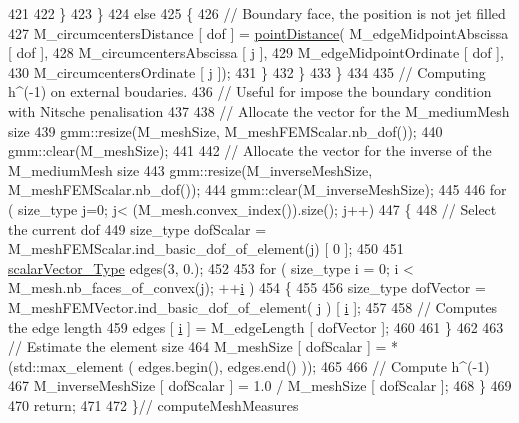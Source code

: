 \begin{DoxyCode}
421 
422                 \}
423             \}
424             \textcolor{keywordflow}{else}
425             \{
426                 \textcolor{comment}{// Boundary face, the position is not jet filled}
427                 M\_circumcentersDistance [ dof ] = \hyperlink{UsefulFunctions_8h_ad9cf8f3fe42287349e8e1b2f1f824958}{pointDistance}( M\_edgeMidpointAbscissa [ dof 
      ],
428                                                                  M\_circumcentersAbscissa [ j ],
429                                                                  M\_edgeMidpointOrdinate [ dof ],
430                                                                  M\_circumcentersOrdinate [ j ]);
431             \}
432         \}
433     \}
434 
435     \textcolor{comment}{// Computing h^(-1) on external boudaries.}
436     \textcolor{comment}{// Useful for impose the boundary condition with Nitsche penalisation}
437 
438     \textcolor{comment}{// Allocate the vector for the M\_mediumMesh size}
439     gmm::resize(M\_meshSize, M\_meshFEMScalar.nb\_dof());
440     gmm::clear(M\_meshSize);
441 
442     \textcolor{comment}{// Allocate the vector for the inverse of the M\_mediumMesh size}
443     gmm::resize(M\_inverseMeshSize, M\_meshFEMScalar.nb\_dof());
444     gmm::clear(M\_inverseMeshSize);
445 
446     \textcolor{keywordflow}{for} ( size\_type j=0; j< (M\_mesh.convex\_index()).size(); j++)
447     \{
448         \textcolor{comment}{// Select the current dof}
449         size\_type dofScalar = M\_meshFEMScalar.ind\_basic\_dof\_of\_element(j) [ 0 ];
450 
451         \hyperlink{Core_8h_a4e75b5863535ba1dd79942de2846eff0}{scalarVector\_Type} edges(3, 0.);
452 
453         \textcolor{keywordflow}{for} ( size\_type i = 0; i < M\_mesh.nb\_faces\_of\_convex(j); ++\hyperlink{matrici_8m_a6f6ccfcf58b31cb6412107d9d5281426}{i} )
454         \{
455 
456             size\_type dofVector = M\_meshFEMVector.ind\_basic\_dof\_of\_element( j ) [ 
      \hyperlink{matrici_8m_a6f6ccfcf58b31cb6412107d9d5281426}{i} ];
457 
458             \textcolor{comment}{// Computes the edge length}
459             edges [ \hyperlink{matrici_8m_a6f6ccfcf58b31cb6412107d9d5281426}{i} ] = M\_edgeLength [ dofVector ];
460 
461         \}
462 
463         \textcolor{comment}{// Estimate the element size}
464         M\_meshSize [ dofScalar ] = *(std::max\_element ( edges.begin(), edges.end() ));
465 
466         \textcolor{comment}{// Compute h^(-1)}
467         M\_inverseMeshSize [ dofScalar ] = 1.0 / M\_meshSize [ dofScalar ];
468     \}
469 
470     \textcolor{keywordflow}{return};
471     
472 \}\textcolor{comment}{// computeMeshMeasures}
\end{DoxyCode}


